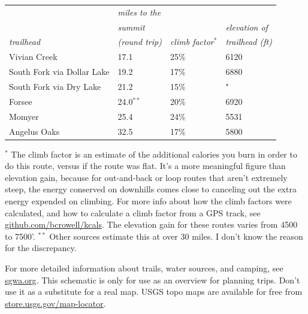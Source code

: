 \documentclass{san-g}
\begin{document}
\begin{tabular}{lp{30mm}ll}
                 & \emph{miles to the}  \\
                 & \emph{summit}       &                           & \emph{elevation of} \\
\emph{trailhead} & \emph{(round trip)} & \emph{climb factor${}^*$} & \emph{trailhead (ft)} \\
Vivian Creek                 &   17.1   &   25\%          & 6120\\
South Fork via Dollar Lake   &   19.2   &   17\%          & 6880\\
South Fork via Dry Lake      &   21.2   &   15\%          & \hspace{2mm} "\\
Forsee                       &   24.0${}^{**}$   &   20\% & 6920 \\
Momyer                       &   25.4   &   24\%          & 5531 \\
Angelus Oaks                 &   32.5   &   17\%          & 5800
\end{tabular}

${}^*$ \scriptsize{The climb factor is an estimate of the additional calories you burn
in order to do this route, versus if the route was flat.
It's a more meaningful figure than elevation gain, because for
out-and-back or loop routes that aren't extremely steep, the energy conserved on
downhills comes close to canceling out the extra energy expended on climbing. For more
info about how the climb factors were calculated, and how to calculate
a climb factor from a GPS track, see \url{github.com/bcrowell/kcals}. The elevation gain for
these routes varies from 4500 to 7500'.
}
${}^{**}$ \scriptsize{Other sources estimate this at over 30 miles. I don't know the reason
for the discrepancy.
}

\vspace{10mm}

\normalsize For more detailed information about trails, water sources, and camping, see \url{sgwa.org}.
This schematic is only for use as an overview for planning trips. Don't use it as a substitute
for a real map. USGS topo maps are available for free from \url{store.usgs.gov/map-locator}.

\vfill

\myfooter
\end{document}
